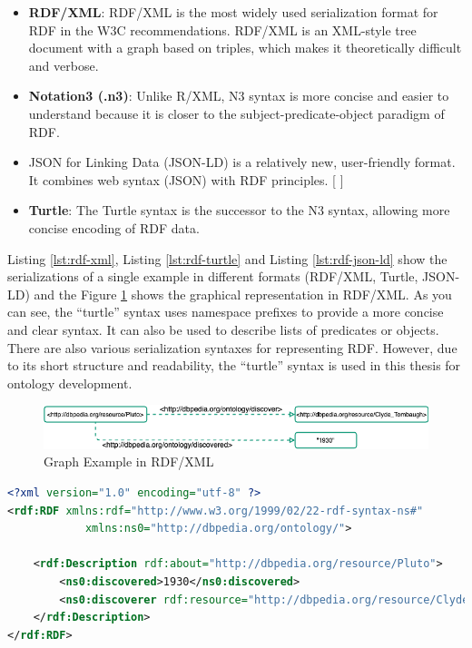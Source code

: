     \begin{itemize}
        \item \textbf{RDF/XML}: RDF/XML is the most widely used serialization format for RDF in the W3C recommendations. RDF/XML is an XML-style tree document with a graph based on triples, which makes it theoretically difficult and verbose. 
        \item \textbf{Notation3 (.n3)}: Unlike R/XML, N3 syntax is more concise and easier to understand because it is closer to the subject-predicate-object paradigm of RDF. 
        \item JSON for Linking Data (JSON-LD) is a relatively new, user-friendly format. It combines web syntax (JSON) with RDF principles. [ ] 
        \item \textbf{Turtle}: The Turtle syntax is the successor to the N3 syntax, allowing more concise encoding of RDF data.
    \end{itemize}

    Listing \ref{lst:rdf-xml}, Listing \ref{lst:rdf-turtle} and Listing \ref{lst:rdf-json-ld} show the serializations of a single example in different formats (RDF/XML, Turtle, JSON-LD) and the Figure \ref{fig:rdf-xml-example} shows the graphical representation in RDF/XML. As you can see, the “turtle” syntax uses namespace prefixes to provide a more concise and clear syntax. It can also be used to describe lists of predicates or objects. There are also various serialization syntaxes for representing RDF. However, due to its short structure and readability, the “turtle” syntax is used in this thesis for ontology development.\\

    \begin{figure}[H]
        \centering
        \includegraphics[scale=0.6]{images/Foundation-RDF XML.drawio.png}
        \caption{\label{fig:rdf-xml-example}  Graph Example in RDF/XML}
    \end{figure}

\begin{lstlisting}[language=XML, caption=Example of RDF Serialization in RDF/XML, label={lst:rdf-xml}]
<?xml version="1.0" encoding="utf-8" ?>
<rdf:RDF xmlns:rdf="http://www.w3.org/1999/02/22-rdf-syntax-ns#"
            xmlns:ns0="http://dbpedia.org/ontology/">

    <rdf:Description rdf:about="http://dbpedia.org/resource/Pluto">
        <ns0:discovered>1930</ns0:discovered>
        <ns0:discoverer rdf:resource="http://dbpedia.org/resource/Clyde_Tombaugh"/>
    </rdf:Description>
</rdf:RDF>
\end{lstlisting}

